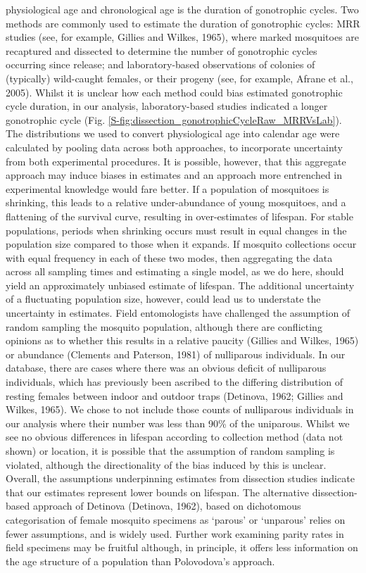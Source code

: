 \documentclass[]{article}
\begin{document}
physiological age and chronological age is the duration of gonotrophic
cycles. Two methods are commonly used to estimate the duration of
gonotrophic cycles: MRR studies (see, for example, Gillies and Wilkes,
1965), where marked mosquitoes are recaptured and dissected to determine
the number of gonotrophic cycles occurring since release; and
laboratory-based observations of colonies of (typically) wild-caught
females, or their progeny (see, for example, Afrane et al., 2005).
Whilst it is unclear how each method could bias estimated gonotrophic
cycle duration, in our analysis, laboratory-based studies indicated a
longer gonotrophic cycle (Fig. \ref{S-fig:dissection_gonotrophicCycleRaw_MRRVsLab}). The distributions we used to
convert physiological age into calendar age were calculated by pooling
data across both approaches, to incorporate uncertainty from both
experimental procedures. It is possible, however, that this aggregate
approach may induce biases in estimates and an approach more entrenched
in experimental knowledge would fare better. If a population of
mosquitoes is shrinking, this leads to a relative under-abundance of
young mosquitoes, and a flattening of the survival curve, resulting in
over-estimates of lifespan. For stable populations, periods when
shrinking occurs must result in equal changes in the population size
compared to those when it expands. If mosquito collections occur with
equal frequency in each of these two modes, then aggregating the data
across all sampling times and estimating a single model, as we do here,
should yield an approximately unbiased estimate of lifespan. The
additional uncertainty of a fluctuating population size, however, could
lead us to understate the uncertainty in estimates. Field entomologists
have challenged the assumption of random sampling the mosquito
population, although there are conflicting opinions as to whether this
results in a relative paucity (Gillies and Wilkes, 1965) or abundance
(Clements and Paterson, 1981) of nulliparous individuals. In our
database, there are cases where there was an obvious deficit of
nulliparous individuals, which has previously been ascribed to the
differing distribution of resting females between indoor and outdoor
traps (Detinova, 1962; Gillies and Wilkes, 1965). We chose to not
include those counts of nulliparous individuals in our analysis where
their number was less than 90\% of the uniparous. Whilst we see no
obvious differences in lifespan according to collection method (data not
shown) or location, it is possible that the assumption of random
sampling is violated, although the directionality of the bias induced by
this is unclear. Overall, the assumptions underpinning estimates from
dissection studies indicate that our estimates represent lower bounds on
lifespan. The alternative dissection-based approach of Detinova
(Detinova, 1962), based on dichotomous categorisation of female mosquito
specimens as `parous' or `unparous' relies on fewer assumptions, and is
widely used. Further work examining parity rates in field specimens may
be fruitful although, in principle, it offers less information on the
age structure of a population than Polovodova's approach.
\end{document}
